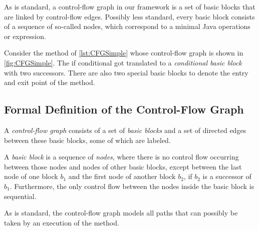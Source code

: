 As is standard, a control-flow graph in our framework is a set of basic blocks
that are linked by control-flow edges. Possibly less standard,
every basic block consists of a sequence
of so-called nodes, which correspond to a minimal Java operations or expression.



Consider the method  of \autoref{lst:CFGSimple} whose control-flow
graph is shown in \autoref{fig:CFGSimple}. The if conditional got translated to
a \emph{conditional basic block} with two successors. There are also two
special basic blocks to denote the entry and exit point of the method.


\subsection{Formal Definition of the Control-Flow Graph}
\label{sec:cfg-formal}

\begin{definition}
    A \emph{control-flow graph} consists of a set of \emph{basic blocks} and
    a set of directed edges between these basic blocks, some of which are labeled.
\end{definition}

\begin{definition}
    A \emph{basic block} is a sequence of \emph{nodes}, where there is no
    control flow occurring between those nodes and nodes of other basic
    blocks, except between the last node of one block $b_1$ and the first node
    of another block $b_2$, if $b_2$ is a successor of $b_1$.
    Furthermore, the only control flow between the nodes inside
    the basic block is sequential.
    
    As is standard, the control-flow graph models all paths that can possibly be taken by
    an execution of the method.
\end{definition}



